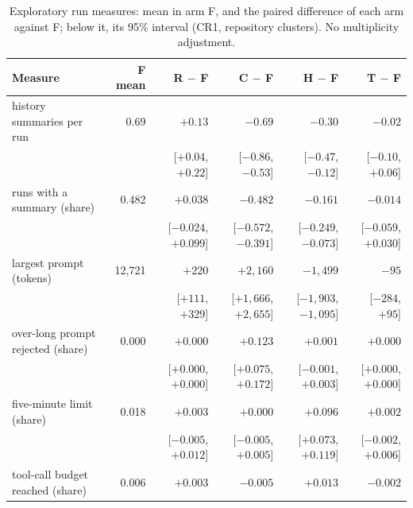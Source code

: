 \begin{table}[!htb]
\centering
\caption{Exploratory run measures: mean in arm F, and the paired difference of each arm against F; below it, its 95\% interval (CR1, repository clusters). No multiplicity adjustment.}\label{tab:s-measures}
\footnotesize\setlength{\tabcolsep}{3.5pt}
\begin{tabular}{lrrrrr}
\toprule
Measure & F mean & R $-$ F & C $-$ F & H $-$ F & T $-$ F \\
\midrule
history summaries per run & 0.69 & ${+}0.13$ & ${-}0.69$ & ${-}0.30$ & ${-}0.02$ \\
 &  & {\scriptsize [${+}0.04$, ${+}0.22$]} & {\scriptsize [${-}0.86$, ${-}0.53$]} & {\scriptsize [${-}0.47$, ${-}0.12$]} & {\scriptsize [${-}0.10$, ${+}0.06$]} \\[-2pt]
\addlinespace[2pt]%
runs with a summary (share) & 0.482 & ${+}0.038$ & ${-}0.482$ & ${-}0.161$ & ${-}0.014$ \\
 &  & {\scriptsize [${-}0.024$, ${+}0.099$]} & {\scriptsize [${-}0.572$, ${-}0.391$]} & {\scriptsize [${-}0.249$, ${-}0.073$]} & {\scriptsize [${-}0.059$, ${+}0.030$]} \\[-2pt]
\addlinespace[2pt]%
largest prompt (tokens) & 12{,}721 & ${+}220$ & ${+}2{,}160$ & ${-}1{,}499$ & ${-}95$ \\
 &  & {\scriptsize [${+}111$, ${+}329$]} & {\scriptsize [${+}1{,}666$, ${+}2{,}655$]} & {\scriptsize [${-}1{,}903$, ${-}1{,}095$]} & {\scriptsize [${-}284$, ${+}95$]} \\[-2pt]
\addlinespace[2pt]%
over-long prompt rejected (share) & 0.000 & ${+}0.000$ & ${+}0.123$ & ${+}0.001$ & ${+}0.000$ \\
 &  & {\scriptsize [${+}0.000$, ${+}0.000$]} & {\scriptsize [${+}0.075$, ${+}0.172$]} & {\scriptsize [${-}0.001$, ${+}0.003$]} & {\scriptsize [${+}0.000$, ${+}0.000$]} \\[-2pt]
\addlinespace[2pt]%
five-minute limit (share) & 0.018 & ${+}0.003$ & ${+}0.000$ & ${+}0.096$ & ${+}0.002$ \\
 &  & {\scriptsize [${-}0.005$, ${+}0.012$]} & {\scriptsize [${-}0.005$, ${+}0.005$]} & {\scriptsize [${+}0.073$, ${+}0.119$]} & {\scriptsize [${-}0.002$, ${+}0.006$]} \\[-2pt]
\addlinespace[2pt]%
tool-call budget reached (share) & 0.006 & ${+}0.003$ & ${-}0.005$ & ${+}0.013$ & ${-}0.002$ \\

\end{tabular}
\end{table}
